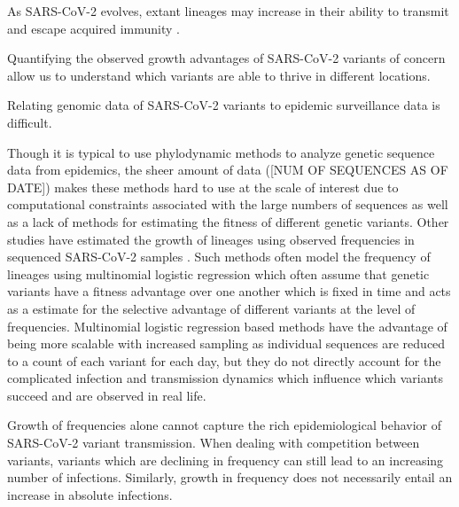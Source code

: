 \documentclass[11pt,oneside,letterpaper]{article}
\begin{document}
As SARS-CoV-2 evolves, extant lineages may increase in their ability to transmit and escape acquired immunity \cite{Tegally2020}. %

Quantifying the observed growth advantages of SARS-CoV-2 variants of concern allow us to understand which variants are able to thrive in different locations.



Relating genomic data of SARS-CoV-2 variants to epidemic surveillance data is difficult.


Though it is typical to use phylodynamic methods to analyze genetic sequence data from epidemics, the sheer amount of data ([NUM OF SEQUENCES AS OF DATE]) makes these methods hard to use at the scale of interest due to computational constraints associated with the large numbers of sequences as well as a lack of methods for estimating the fitness of different genetic variants. 
Other studies have estimated the growth of lineages using observed frequencies in sequenced SARS-CoV-2 samples \cite{Annavajhala2021, Faria2021, Obermeyer2021, Ito2021}. %
Such methods often model the frequency of lineages using multinomial logistic regression \cite{Ito2021, Obermeyer2021} which often assume that genetic variants have a fitness advantage over one another which is fixed in time and acts as a estimate for the selective advantage of different variants at the level of frequencies.
Multinomial logistic regression based methods have the advantage of being more scalable with increased sampling as individual sequences are reduced to a count of each variant for each day, but they do not directly account for the complicated infection and transmission dynamics which influence which variants succeed and are observed in real life.

Growth of frequencies alone cannot capture the rich epidemiological behavior of SARS-CoV-2 variant transmission.
When dealing with competition between variants, variants which are declining in frequency can still lead to an increasing number of infections.
Similarly, growth in frequency does not necessarily entail an increase in absolute infections.
\end{document}
